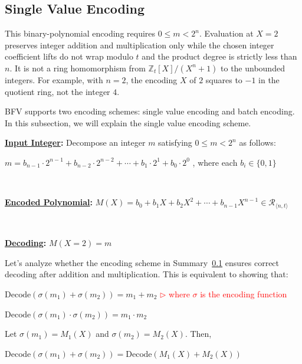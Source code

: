 \clearpage

\subsection{Single Value Encoding}
\label{subsec:bfv-single-encoding}

This binary-polynomial encoding requires $0\leq m<2^n$. Evaluation at $X=2$ preserves integer addition and multiplication only while the chosen integer coefficient lifts do not wrap modulo $t$ and the product degree is strictly less than $n$. It is not a ring homomorphism from $\mathbb Z_t[X]/(X^n+1)$ to the unbounded integers. For example, with $n=2$, the encoding $X$ of $2$ squares to $-1$ in the quotient ring, not the integer $4$.

BFV supports two encoding schemes: single value encoding and batch encoding. In this subsection, we will explain the single value encoding scheme. 



\begin{tcolorbox}[title={\textbf{\tboxlabel{\ref*{subsec:bfv-single-encoding}} BFV Encoding}}]

\textbf{\underline{Input Integer}:} Decompose an integer $m$ satisfying $0\leq m<2^n$ as follows:

$m = b_{n-1}\cdot 2^{n-1} + b_{n-2}\cdot 2^{n-2} + \cdots + b_1\cdot 2^1 + b_0\cdot 2^0$  \text { } , where each $b_i \in \{0, 1\}$

$ $


\textbf{\underline{Encoded Polynomial}:} $M(X) = b_0 + b_1X + b_2X^2 + \cdots + b_{n-1}X^{n-1} \in \mathcal{R}_{\langle n, t\rangle}$

$ $

\textbf{\underline{Decoding}:} $M(X=2) = m$

\end{tcolorbox}


Let's analyze whether the encoding scheme in Summary~\ref*{subsec:bfv-single-encoding} ensures correct decoding after addition and multiplication. This is equivalent to showing that:

$\text{Decode}(\sigma(m_1) + \sigma(m_2)) = m_1 + m_2$ \textcolor{red}{$\rhd$ where $\sigma$ is the encoding function}

$\text{Decode}(\sigma(m_1) \cdot \sigma(m_2)) = m_1 \cdot m_2$

Let $\sigma(m_1) = M_1(X)$ and $\sigma(m_2) = M_2(X)$. Then, 

$\text{Decode}(\sigma(m_1) + \sigma(m_2)) = \text{Decode}(M_1(X) + M_2(X))$


